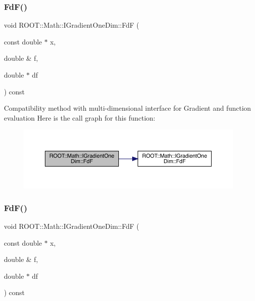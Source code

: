\mbox{\label{classROOT_1_1Math_1_1IGradientOneDim_a4d51d8a5bfdb547348b6da33008f6a9e}} 
\subsubsection{\texorpdfstring{FdF()}{FdF()}\hspace{0.1cm}{\footnotesize\ttfamily [4/6]}}
{\footnotesize\ttfamily void R\+O\+O\+T\+::\+Math\+::\+I\+Gradient\+One\+Dim\+::\+FdF (\begin{DoxyParamCaption}\item[{const double $\ast$}]{x,  }\item[{double \&}]{f,  }\item[{double $\ast$}]{df }\end{DoxyParamCaption}) const\hspace{0.3cm}{\ttfamily [inline]}}

Compatibility method with multi-\/dimensional interface for Gradient and function evaluation Here is the call graph for this function\+:
\nopagebreak
\begin{figure}[H]
\begin{center}
\leavevmode
\includegraphics[width=350pt]{da/d8e/classROOT_1_1Math_1_1IGradientOneDim_a4d51d8a5bfdb547348b6da33008f6a9e_cgraph}
\end{center}
\end{figure}
\mbox{\label{classROOT_1_1Math_1_1IGradientOneDim_a4d51d8a5bfdb547348b6da33008f6a9e}} 
\subsubsection{\texorpdfstring{FdF()}{FdF()}\hspace{0.1cm}{\footnotesize\ttfamily [5/6]}}
{\footnotesize\ttfamily void R\+O\+O\+T\+::\+Math\+::\+I\+Gradient\+One\+Dim\+::\+FdF (\begin{DoxyParamCaption}\item[{const double $\ast$}]{x,  }\item[{double \&}]{f,  }\item[{double $\ast$}]{df }\end{DoxyParamCaption}) const\hspace{0.3cm}{\ttfamily [inline]}}

